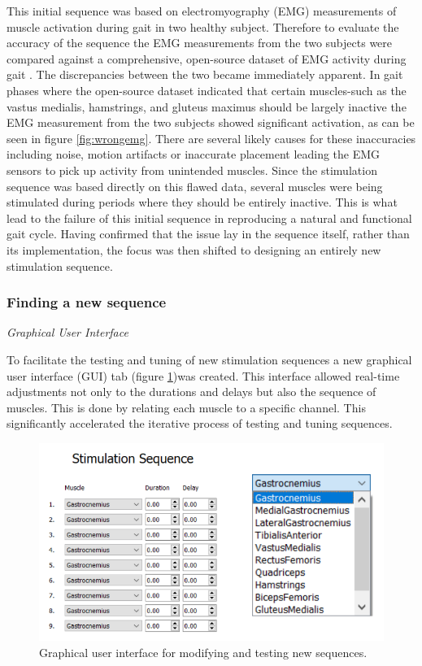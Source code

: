 This initial sequence was based on electromyography (EMG) measurements of muscle activation during gait in two healthy subject. Therefore to evaluate the accuracy of the sequence the EMG measurements from the two subjects were compared against a comprehensive, open-source dataset of EMG activity during gait \cite{camargo_comprehensive_2021}. The discrepancies between the two became immediately apparent. In gait phases where the open-source dataset indicated that certain muscles-such as the vastus medialis, hamstrings, and gluteus maximus should be largely inactive the EMG measurement from the two subjects showed significant activation, as can be seen in figure \ref{fig:wrongemg}. There are several likely causes for these inaccuracies including noise, motion artifacts or inaccurate placement leading the EMG sensors to pick up activity from unintended muscles. Since the stimulation sequence was based directly on this flawed data, several muscles were being stimulated during periods where they should be entirely inactive. This is what lead to the failure of this initial sequence in reproducing a natural and functional gait cycle. Having confirmed that the issue lay in the sequence itself, rather than its implementation, the focus was then shifted to designing an entirely new stimulation sequence.

\subsubsection{Finding a new sequence}

\textit{Graphical User Interface}

To facilitate the testing and tuning of new stimulation sequences a new graphical user interface (GUI) tab (figure \ref{fig:sequenceGUI})was created. This interface allowed real-time adjustments not only to the durations and delays but also the sequence of muscles. This is done by relating each muscle to a specific channel. This significantly accelerated the iterative process of testing and tuning sequences. 

\begin{figure} [h]
    \centering
    \includegraphics[width=0.8\linewidth]{images/sequenceGUI.png}
    \caption{Graphical user interface for modifying and testing new sequences.}
    \label{fig:sequenceGUI}
\end{figure}

